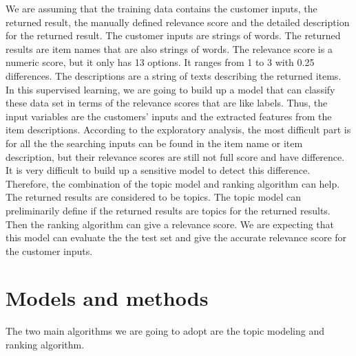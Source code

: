 \documentclass[twoside]{article}
\begin{document}
We are assuming that the training data contains the customer inputs, the returned result, the manually defined relevance score and the detailed description for the returned result. The customer inputs are strings of words. The returned results are item names that are also strings of words. The relevance score is a numeric score, but it only has 13 options. It ranges from 1 to 3 with 0.25 differences. The descriptions are a string of texts describing the returned items. In this supervised learning, we are going to build up a model that can classify these data set in terms of the relevance scores that are like labels. Thus, the input variables are the customers' inputs and the extracted features from the item descriptions. According to the exploratory analysis, the most difficult part is for all the the searching inputs can be found in the item name or item description, but their relevance scores are still not full score and have difference. It is very difficult to build up a sensitive model to detect this difference. Therefore, the combination of the topic model and ranking algorithm can help. The returned results are considered to be topics. The topic model can preliminarily define if the returned results are topics for the returned results. Then the ranking algorithm can give a relevance score. We are expecting that this model can evaluate the the test set and give the accurate relevance score for the customer inputs. 


\section{Models and methods}


The two main algorithms we are going to adopt are the topic modeling and ranking algorithm. 
\end{document}
